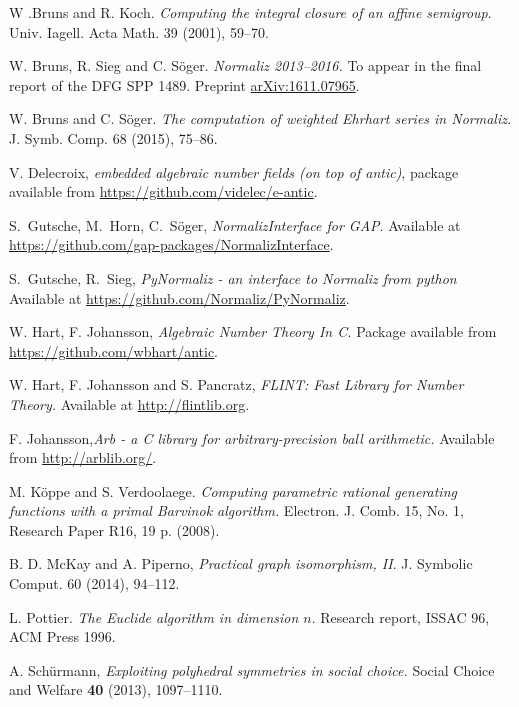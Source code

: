 \documentclass[12pt,a4paper]{scrartcl}
\theoremstyle{definition}
\begin{document}
\begin{thebibliography}{15.}
 W .Bruns and R. Koch. {\em Computing the integral
closure of an affine semigroup}. Univ. Iagell. Acta Math.
39 (2001), 59--70.

 W. Bruns, R. Sieg and C. S\"oger. {\em Normaliz 2013--2016.} To appear in the final report of the DFG SPP 1489. Preprint \url{ arXiv:1611.07965}.

 W. Bruns and C. S\"oger. {\em The computation of weighted Ehrhart series in Normaliz.} J. Symb. Comp. 68 (2015), 75--86.

 V. Delecroix, {\em embedded algebraic number fields (on top of antic)}, package available from \url{https://github.com/videlec/e-antic}.

 S.~Gutsche, M.~Horn, C.~S\"oger,
\emph{NormalizInterface for GAP}. 
Available at \url{https://github.com/gap-packages/NormalizInterface}.

 S.~Gutsche, R.~Sieg,
\emph{PyNormaliz - an interface to Normaliz from python}
Available at \url{https://github.com/Normaliz/PyNormaliz}.

 W. Hart, F. Johansson, {\em Algebraic Number Theory In C.} Package available from \url{https://github.com/wbhart/antic}.

 W. Hart, F. Johansson and S. Pancratz, \emph{FLINT: Fast Library for Number Theory.} Available at \url{ http://flintlib.org}.

 F. Johansson,{\em Arb - a C library for arbitrary-precision ball arithmetic.} Available from \url{http://arblib.org/}.

 M. K\"oppe and S. Verdoolaege. {\em  Computing
parametric rational generating functions with a primal
Barvinok algorithm.} Electron. J. Comb.
15, No. 1, Research Paper R16, 19 p. (2008).

B. D. McKay and A. Piperno,
\emph{Practical graph isomorphism, II}.
J. Symbolic Comput. { 60} (2014), 94--112.

 L. Pottier. {\em The Euclide algorithm in dimension
$n$}. Research report, ISSAC 96, ACM Press 1996.

 A. Sch\"{u}rmann, {\em Exploiting
	polyhedral symmetries in social choice.}
Social Choice and Welfare \textbf{40} (2013), 1097--1110.
\end{thebibliography}
\end{document}
